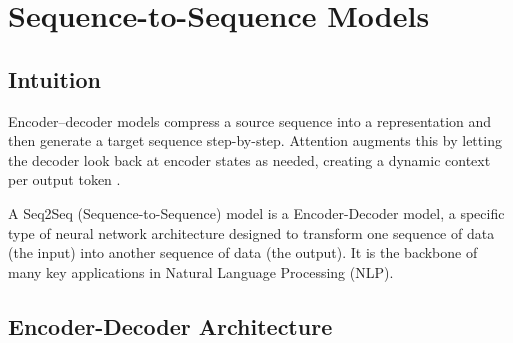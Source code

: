 
\section{Sequence-to-Sequence Models }
\label{sec:seq2seq}

\subsection*{Intuition}

Encoder–decoder models compress a source sequence into a representation and then generate a target sequence step-by-step. Attention augments this by letting the decoder look back at encoder states as needed, creating a dynamic context per output token \cite{Cho2014,Bahdanau2014}.

\begin{remark}
A Seq2Seq (Sequence-to-Sequence) model is a Encoder-Decoder model, a specific type of neural network architecture designed to transform one sequence of data (the input) into another sequence of data (the output). It is the backbone of many key applications in Natural Language Processing (NLP).
\end{remark}




\subsection{Encoder-Decoder Architecture}

